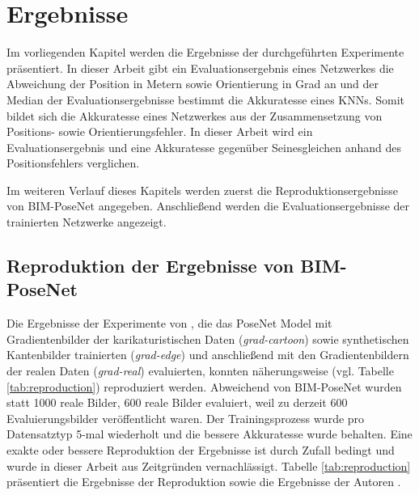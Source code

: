 
\section{Ergebnisse}
Im vorliegenden Kapitel werden die Ergebnisse der durchgeführten Experimente präsentiert. In dieser Arbeit gibt ein Evaluationsergebnis eines Netzwerkes die Abweichung der Position in Metern sowie Orientierung in Grad an und der Median der Evaluationsergebnisse bestimmt die Akkuratesse eines KNNs. Somit bildet sich die Akkuratesse eines Netzwerkes aus der Zusammensetzung von Positions- sowie Orientierungsfehler. In dieser Arbeit wird ein Evaluationsergebnis und eine Akkuratesse gegenüber Seinesgleichen anhand des Positionsfehlers verglichen.

Im weiteren Verlauf dieses Kapitels werden zuerst die Reproduktionsergebnisse von BIM-PoseNet \cite{acharyaBIMPoseNetIndoorCamera2019} angegeben. Anschließend werden die Evaluationsergebnisse der trainierten Netzwerke angezeigt.

\subsection{Reproduktion der Ergebnisse von BIM-PoseNet}
Die Ergebnisse der Experimente von \citet{acharyaBIMPoseNetIndoorCamera2019}, die das PoseNet Model mit Gradientenbilder der karikaturistischen Daten (\textit{grad-cartoon}) sowie synthetischen Kantenbilder trainierten (\textit{grad-edge}) und anschließend mit den Gradientenbildern der realen Daten (\textit{grad-real}) evaluierten, konnten näherungsweise (vgl. Tabelle \ref{tab:reproduction}) reproduziert werden. Abweichend von BIM-PoseNet wurden statt 1000 reale Bilder, 600 reale Bilder evaluiert, weil zu derzeit 600 Evaluierungsbilder veröffentlicht waren. Der Trainingsprozess wurde pro Datensatztyp 5-mal wiederholt und die bessere Akkuratesse wurde behalten. Eine exakte oder bessere Reproduktion der Ergebnisse ist durch Zufall bedingt und wurde in dieser Arbeit aus Zeitgründen vernachlässigt. Tabelle \ref{tab:reproduction} präsentiert die Ergebnisse der Reproduktion sowie die Ergebnisse der Autoren \citet{acharyaBIMPoseNetIndoorCamera2019}.


